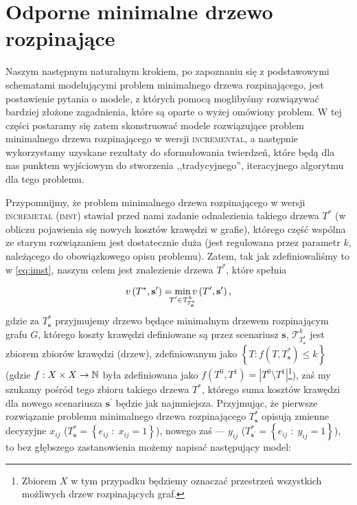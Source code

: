 \section{Odporne minimalne drzewo rozpinające}

Naszym następnym naturalnym krokiem, po zapoznaniu się z podstawowymi schematami modelującymi problem minimalnego drzewa rozpinającego, jest postawienie pytania o modele, z których pomocą moglibyśmy rozwiązywać bardziej złożone zagadnienia, które są oparte o wyżej omówiony problem. W tej części postaramy się zatem skonstruować modele rozwiązujące problem minimalnego drzewa rozpinającego w wersji \textsc{incremental}, a następnie wykorzystamy uzyskane rezultaty do sformułowania twierdzeń, które będą dla nas punktem wyjściowym do stworzenia ,,tradycyjnego'', iteracyjnego algorytmu dla tego problemu.

Przypomnijmy, że problem minimalnego drzewa rozpinającego w wersji \textsc{incremetal} (\textsc{imst}) stawiał przed nami zadanie odnalezienia takiego drzewa $T^{\ast}$ (w obliczu pojawienia się nowych kosztów krawędzi w grafie), którego część wspólna ze starym rozwiązaniem jest dostatecznie duża (jest regulowana przez parametr $k$, należącego do obowiązkowego opisu problemu). Zatem, tak jak zdefiniowaliśmy to w \ref{eq:imst}, naszym celem jest znalezienie drzewa $T^{\ast}$, które spełnia

\begin{equation}
	v \left( T^{\ast}, \textbf{s}^{\prime} \right) = \min_{\mathclap{T^{\prime} \in \mathcal{T}^{k}_{T^{\ast}_{\textbf{s}}}}} v \left( T^{\prime}, \textbf{s}^{\prime} \right)\text{,}
\end{equation}
gdzie za $T^{\ast}_{\textbf{s}}$ przyjmujemy drzewo będące minimalnym drzewem rozpinającym grafu $G$, którego koszty krawędzi definiowane są przez scenariusz $\textbf{s}$, $\mathcal{T}^{k}_{T^{\ast}_{\textbf{s}}}$ jest zbiorem zbiorów krawędzi (drzew), zdefiniowanym jako $\left\{ T : f \left( T, T^{\ast}_{\textbf{s}} \right) \leqslant k \right\}$ (gdzie $f: X \times X \rightarrow \mathbb{N}$ była zdefiniowana jako $f \left( T^{0}, T^{1} \right) = \left| T^{0} \setminus T^{1} \right|$\footnote{Zbiorem $X$ w tym przypadku będziemy oznaczać przestrzeń wszystkich możliwych drzew rozpinających graf.}), zaś my szukamy pośród tego zbioru takiego drzewa $T^{\ast}$, którego suma kosztów krawędzi dla nowego scenariusza $\textbf{s}^{\prime}$ będzie jak najmniejsza. Przyjmując, że pierwsze rozwiązanie problemu minimalnego drzewa rozpinającego $T^{\ast}_{\textbf{s}}$ opisują zmienne decyzyjne $x_{ij}$ ($T^{\ast}_{\textbf{s}} = \left\{ e_{ij} \; : \; x_{ij} = 1 \right\}$), nowego zaś --- $y_{ij}$ ($T^{\ast}_{\textbf{s}^{\prime}} = \left\{ e_{ij} \; : \; y_{ij} = 1 \right\}$), to bez głębszego zastanowienia możemy napisać następujący model:

